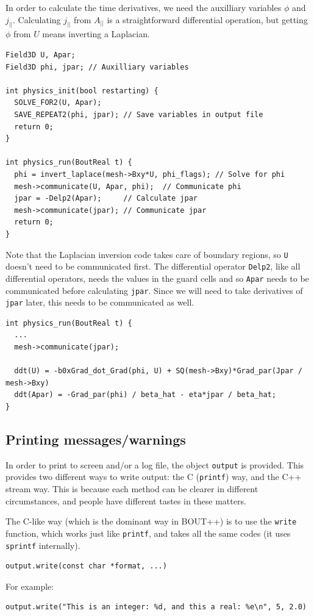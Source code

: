\documentclass[12pt]{article}
\newcommand{\code}[1]{\texttt{#1}}
\begin{document}
In order to calculate the time derivatives, we need the auxilliary variables
$\phi$ and $j_{||}$. Calculating $j_{||}$ from $A_{||}$ is a straightforward
differential operation, but getting $\phi$ from $U$ means inverting a Laplacian.
\begin{lstlisting}
Field3D U, Apar;
Field3D phi, jpar; // Auxilliary variables

int physics_init(bool restarting) {
  SOLVE_FOR2(U, Apar);
  SAVE_REPEAT2(phi, jpar); // Save variables in output file
  return 0;
}

int physics_run(BoutReal t) {
  phi = invert_laplace(mesh->Bxy*U, phi_flags); // Solve for phi
  mesh->communicate(U, Apar, phi);  // Communicate phi
  jpar = -Delp2(Apar);     // Calculate jpar
  mesh->communicate(jpar); // Communicate jpar
  return 0;
}
\end{lstlisting}
Note that the Laplacian inversion code takes care of boundary regions,
so \lstinline!U! doesn't need to be communicated first. The differential operator
\lstinline!Delp2!, like all differential operators, needs the values
in the guard cells and so \lstinline!Apar! needs to be communicated
before calculating \lstinline!jpar!. Since we will need to take derivatives
of \lstinline!jpar! later, this needs to be communicated as well.
\begin{lstlisting}
int physics_run(BoutReal t) {
  ...
  mesh->communicate(jpar);
  
  ddt(U) = -b0xGrad_dot_Grad(phi, U) + SQ(mesh->Bxy)*Grad_par(Jpar / mesh->Bxy)
  ddt(Apar) = -Grad_par(phi) / beta_hat - eta*jpar / beta_hat;
}
\end{lstlisting}

\subsection{Printing messages/warnings}
\label{sec:printing}

In order to print to screen and/or a log file, the object \code{output} is provided. 
This provides two different ways to write output: the C (\code{printf}) way, and the
C++ stream way. This is because each method can be clearer in different circumstances,
and people have different tastes in these matters. 

The C-like way (which is the dominant way in BOUT++) is to use the \code{write} function,
which works just like \code{printf}, and takes all the same codes (it uses \code{sprintf}
internally). 
\begin{lstlisting}
output.write(const char *format, ...)
\end{lstlisting}
For example:
\begin{lstlisting}
output.write("This is an integer: %d, and this a real: %e\n", 5, 2.0)
\end{lstlisting}
\end{document}
